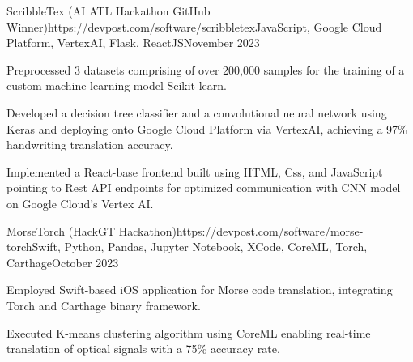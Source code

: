 \documentclass{article}
\begin{document}
\begin{flushleft}
    \begin{project}{ScribbleTex (AI ATL Hackathon GitHub Winner)}{https://devpost.com/software/scribbletex}{JavaScript, Google Cloud Platform, VertexAI, Flask, ReactJS}{November 2023}
        \item Preprocessed 3 datasets comprising of over 200,000 samples for the training of a custom machine learning model Scikit-learn.
        \item Developed a decision tree classifier and a convolutional neural network using Keras and deploying onto Google Cloud Platform via VertexAI, achieving a 97\% handwriting translation accuracy.
        \item Implemented a React-base frontend built using HTML, Css, and JavaScript pointing to Rest API endpoints for optimized communication with CNN model on Google Cloud's Vertex AI.
    \end{project}

    \begin{project}{MorseTorch (HackGT Hackathon)}{https://devpost.com/software/morse-torch}{Swift, Python, Pandas, Jupyter Notebook, XCode, CoreML, Torch, Carthage}{October 2023}
        \item Employed Swift-based iOS application for Morse code translation, integrating Torch and Carthage binary framework.
        \item Executed K-means clustering algorithm using CoreML enabling real-time translation of optical signals with a 75\% accuracy rate.
        
    \end{project}


    \vspace{3pt}
     \\
     \\
    \\
     \\
    

\end{flushleft}
\end{document}
